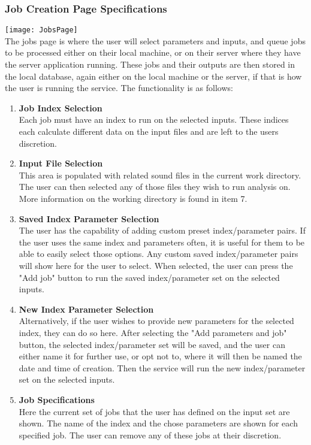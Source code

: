 \subsubsection{Job Creation Page Specifications}
\texttt{[image: JobsPage]}\\
The jobs page is where the user will select parameters and inputs, and queue jobs to be processed either on their local machine, or on their server where they have the server application running. These jobs and their outputs are then stored in the local database, again either on the local machine or the server, if that is how the user is running the service. The functionality is as follows:\\
\begin{enumerate}
    \item \textbf{Job Index Selection}\\ Each job must have an index to run on the selected inputs. These indices each calculate different data on the input files and are left to the user\textquotesingle s discretion.
    \item \textbf{Input File Selection}\\ This area is populated with related sound files in the current work directory. The user can then selected any of those files they wish to run analysis on. More information on the working directory is found in item 7.
    \item \textbf{Saved Index Parameter Selection}\\ The user has the capability of adding custom preset index/parameter pairs. If the user uses the same index and parameters often, it is useful for them to be able to easily select those options. Any custom saved index/parameter pairs will show here for the user to select. When selected, the user can press the "Add job" button to run the saved index/parameter set on the selected inputs.
    \item \textbf{New Index Parameter Selection}\\ Alternatively, if the user wishes to provide new parameters for the selected index, they can do so here. After selecting the "Add parameters and job" button, the selected index/parameter set will be saved, and the user can either name it for further use, or opt not to, where it will then be named the date and time of creation. Then the service will run the new index/parameter set on the selected inputs.
    \item \textbf{Job Specifications}\\ Here the current set of jobs that the user has defined on the input set are shown. The name of the index and the chose parameters are shown for each specified job. The user can remove any of these jobs at their discretion.

\end{enumerate}
